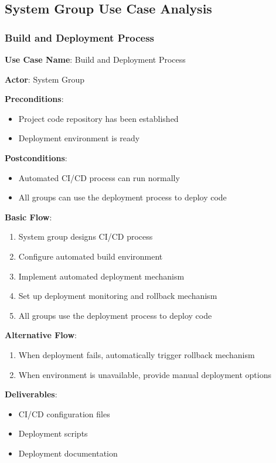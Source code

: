 \documentclass[a4paper,12pt]{article}
\begin{document}
\subsection{System Group Use Case Analysis}

\subsubsection{Build and Deployment Process}

\textbf{Use Case Name}: Build and Deployment Process

\textbf{Actor}: System Group

\textbf{Preconditions}:
\begin{itemize}
  \item Project code repository has been established
  \item Deployment environment is ready
\end{itemize}

\textbf{Postconditions}:
\begin{itemize}
  \item Automated CI/CD process can run normally
  \item All groups can use the deployment process to deploy code
\end{itemize}

\textbf{Basic Flow}:
\begin{enumerate}
  \item System group designs CI/CD process
  \item Configure automated build environment
  \item Implement automated deployment mechanism
  \item Set up deployment monitoring and rollback mechanism
  \item All groups use the deployment process to deploy code
\end{enumerate}

\textbf{Alternative Flow}:
\begin{enumerate}
  \item When deployment fails, automatically trigger rollback mechanism
  \item When environment is unavailable, provide manual deployment options
\end{enumerate}

\textbf{Deliverables}:
\begin{itemize}
  \item CI/CD configuration files
  \item Deployment scripts
  \item Deployment documentation
\end{itemize}
\end{document}

